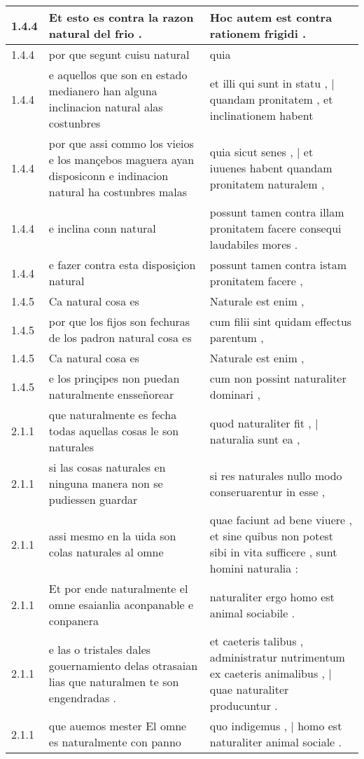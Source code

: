 \begin{tabular}{|p{1cm}|p{6.5cm}|p{6.5cm}|}
1.4.4 & Et esto es contra la razon natural del frio . & Hoc autem est contra rationem frigidi . \\\hline
1.4.4 & por que segunt cuisu natural & quia \\\hline
1.4.4 & e aquellos que son en estado medianero han alguna inclinacion natural alas costunbres & et illi qui sunt in statu , | quandam pronitatem , et inclinationem habent \\\hline
1.4.4 & por que assi commo los vieios e los mançebos maguera ayan disposiconn e indinacion natural ha costunbres malas & quia sicut senes , | et iuuenes habent quandam pronitatem naturalem , \\\hline
1.4.4 & e inclina conn natural & possunt tamen contra illam pronitatem facere consequi laudabiles mores . \\\hline
1.4.4 & e fazer contra esta disposiçion natural & possunt tamen contra istam pronitatem facere , \\\hline
1.4.5 & Ca natural cosa es & Naturale est enim , \\\hline
1.4.5 & por que los fijos son fechuras de los padron natural cosa es & cum filii sint quidam effectus parentum , \\\hline
1.4.5 & Ca natural cosa es & Naturale est enim , \\\hline
1.4.5 & e los prinçipes non puedan naturalmente ensseñorear & cum non possint naturaliter dominari , \\\hline
2.1.1 & que naturalmente es fecha todas aquellas cosas le son naturales & quod naturaliter fit , | naturalia sunt ea , \\\hline
2.1.1 & si las cosas naturales en ninguna manera non se pudiessen guardar & si res naturales nullo modo conseruarentur in esse , \\\hline
2.1.1 & assi mesmo en la uida son colas naturales al omne & quae faciunt ad bene viuere , et sine quibus non potest sibi in vita sufficere , sunt homini naturalia : \\\hline
2.1.1 & Et por ende naturalmente el omne esaianlia aconpanable e conpanera & naturaliter ergo homo est animal sociabile . \\\hline
2.1.1 & e las o tristales dales gouernamiento delas otrasaian lias que naturalmen te son engendradas . & et caeteris talibus , administratur nutrimentum ex caeteris animalibus , | quae naturaliter producuntur . \\\hline
2.1.1 & que auemos mester El omne es naturalmente con panno & quo indigemus , | homo est naturaliter animal sociale . \\\hline

\end{tabular}
